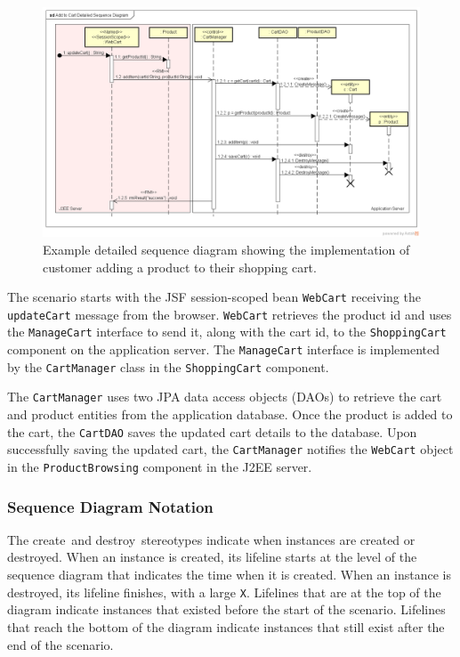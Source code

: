 \begin{figure}[h!]
    \centering
    \begin{adjustwidth}{-11mm}{-11mm}
        \includegraphics[trim=35 70 31 49,clip,width=0.98\paperwidth]{images/uml/detailed_sequence_diagram.png}
    \end{adjustwidth}
    \caption{Example detailed sequence diagram showing the implementation of customer adding a product to their shopping cart.}
    \label{fig:detailedSequenceDiagram}
\end{figure}

\noindent
The scenario starts with the JSF session-scoped bean \texttt{WebCart} receiving the \texttt{updateCart} message from the browser.
\texttt{WebCart} retrieves the product id and uses the \texttt{ManageCart} interface to send it, along with the cart id,
to the \texttt{ShoppingCart} component on the application server.
The \texttt{ManageCart} interface is implemented by the \texttt{CartManager} class in the \texttt{ShoppingCart} component.

The \texttt{CartManager} uses two JPA data access objects (DAOs) to retrieve the cart and product entities from the application database.
Once the product is added to the cart, the \texttt{CartDAO} saves the updated cart details to the database.
Upon successfully saving the updated cart, the \texttt{CartManager} notifies the \texttt{WebCart}
object in the \texttt{ProductBrowsing} component in the J2EE server.

\subsubsection{Sequence Diagram Notation}
The \guillemotleft create\guillemotright~and \guillemotleft destroy\guillemotright~stereotypes indicate when instances are created or destroyed.
When an instance is created, its lifeline starts at the level of the sequence diagram that indicates the time when it is created.
When an instance is destroyed, its lifeline finishes, with a large \texttt{X}.
Lifelines that are at the top of the diagram indicate instances that existed before the start of the scenario.
Lifelines that reach the bottom of the diagram indicate instances that still exist after the end of the scenario.

